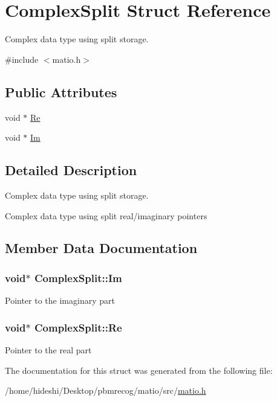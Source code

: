 \hypertarget{structComplexSplit}{\section{\-Complex\-Split \-Struct \-Reference}
\label{structComplexSplit}
}


\-Complex data type using split storage.  




{\ttfamily \#include $<$matio.\-h$>$}

\subsection*{\-Public \-Attributes}
\begin{DoxyCompactItemize}
\item 
void $\ast$ \hyperlink{structComplexSplit_ab9c3f2544c4325a372300d4546e374a8}{\-Re}
\item 
void $\ast$ \hyperlink{structComplexSplit_abdf9792203bd776fb6be4ceebf078402}{\-Im}
\end{DoxyCompactItemize}


\subsection{\-Detailed \-Description}
\-Complex data type using split storage. 

\-Complex data type using split real/imaginary pointers 

\subsection{\-Member \-Data \-Documentation}
\hypertarget{structComplexSplit_abdf9792203bd776fb6be4ceebf078402}{
\subsubsection[{\-Im}]{\setlength{\rightskip}{0pt plus 5cm}void$\ast$ {\bf \-Complex\-Split\-::\-Im}}}\label{structComplexSplit_abdf9792203bd776fb6be4ceebf078402}
\-Pointer to the imaginary part \hypertarget{structComplexSplit_ab9c3f2544c4325a372300d4546e374a8}{
\subsubsection[{\-Re}]{\setlength{\rightskip}{0pt plus 5cm}void$\ast$ {\bf \-Complex\-Split\-::\-Re}}}\label{structComplexSplit_ab9c3f2544c4325a372300d4546e374a8}
\-Pointer to the real part 

\-The documentation for this struct was generated from the following file\-:\begin{DoxyCompactItemize}
\item 
/home/hideshi/\-Desktop/pbmrecog/matio/src/\hyperlink{matio_8h}{matio.\-h}\end{DoxyCompactItemize}
